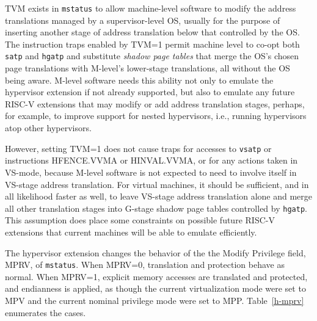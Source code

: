 \begin{commentary}
TVM exists in {\tt mstatus} to allow machine-level software to modify
the address translations managed by a supervisor-level OS, usually for
the purpose of inserting another stage of address translation below
that controlled by the OS.
The instruction traps enabled by TVM=1 permit machine level
to co-opt both {\tt satp} and {\tt hgatp} and substitute
\emph{shadow page tables} that merge the OS's chosen page translations
with M-level's lower-stage translations, all without the OS being
aware.
M-level software needs this ability not only to emulate the hypervisor
extension if not already supported, but also to emulate any future
\mbox{RISC-V} extensions that may modify or add address translation
stages, perhaps, for example, to improve support for nested
hypervisors, i.e., running hypervisors atop other hypervisors.

However, setting TVM=1 does not cause traps for accesses to {\tt vsatp}
or instructions HFENCE.VVMA or HINVAL.VVMA, or for any actions taken
in VS-mode, because M-level software is not expected to need to involve
itself in VS-stage address translation.
For virtual machines, it should be sufficient, and in all likelihood
faster as well, to leave VS-stage address translation alone and merge
all other translation stages into G-stage shadow page tables controlled
by {\tt hgatp}.
This assumption does place some constraints on possible future
\mbox{RISC-V} extensions that current machines will be able to emulate
efficiently.
\end{commentary}

The hypervisor extension changes the behavior of the the Modify Privilege
field, MPRV, of {\tt mstatus}.
When MPRV=0, translation and protection behave as normal.
When MPRV=1, explicit memory accesses are translated and protected, and
endianness is applied, as though the current virtualization mode were set
to MPV and the current nominal privilege mode were set to MPP.
Table~\ref{h-mprv} enumerates the cases.

